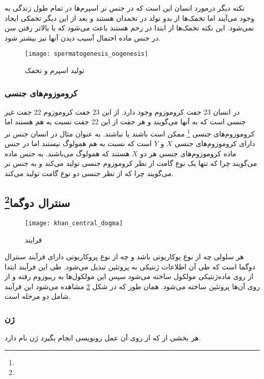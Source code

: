 نکته دیگر درمورد انسان این است که در جنس نر اسپرم‌ها در تمام طول زندگی به وجود می‌آیند اما تخمک‌ها از بدو تولد در تخمدان هستند و بعد از این دیگر تخمکی ایجاد نمی‌شود. این نکته تخمک‌ها از ابتدا در رحم هستند باعث می‌شود که با بالاتر رفتن سن در جنس ماده احتمال آسیب دیدن آنها نیز بیشتر شود.

\begin{figure}[htbp]
	\centering
	\texttt{[image: spermatogenesis\_oogenesis]}
	\caption{تولید اسپرم و تخمک}
	\label{figure:spermatogenesis}
\end{figure}

\subsubsection{کروموزوم‌های جنسی}
در انسان 23 جفت کروموزوم وجود دارد. از این 23 جفت کروموزوم 22 جفت غیر جنسی است که به آنها
می‌گویند
و هر جفت از این 22 جفت نسبت به هم
هستند اما کروموزوم‌های جنسی
\footnote{}
 ممکن است
باشند یا نباشند. به عنوان مثال در انسان جنس نر دارای کروموزوم‌های جنسی $ X $
و
$ Y $
است که نسبت به هم همولوگ نیستند اما در جنس ماده کروموزوم‌های جنسی
هر دو
$ X $
هستند که همولوگ می‌باشند.
به جنس ماده
می‌گویند چرا که تنها یک نوع گامت از نظر کروموزوم جنسی تولید می‌کند و به جنس نر
می‌گویند چرا که از نظر جنسی دو نوع گامت تولید می‌کند.

\pagebreak
\subsection{سنترال دوگما\protect\footnote{}}

\begin{figure}[htbp]
	\centering
	\texttt{[image: khan\_central\_dogma]}
	\caption{فرايند
	}
	\label{figure:CentralDogma}
\end{figure}

هر سلولی چه از نوع یوکاریوتی باشد و چه از نوع پروکاریوتی دارای فرآیند سنترال دوگما است که طی آن اطلاعات ژنتیکی به پروتئین تبدیل می‌شود.
طی این فرآیند ابتدا از روی ماده‌ژنتیکی مولکول
ساخته می‌شود سپس این مولکول‌ها به ریبوزوم رفته و از روی آن‌ها پروتئین ساخته می‌شود.
همان طور که در شکل
\ref{figure:CentralDogma}
مشاهده می‌شود این فرآیند شامل دو مرحله است.

\subsubsection{ژن}
هر بخشی از
که از روی آن عمل رونویسی انجام بگیرد ژن نام دارد.

